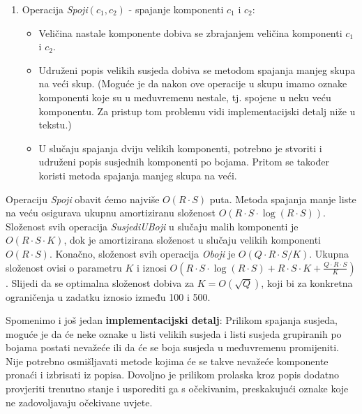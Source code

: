 \begin{enumerate}
  \item Operacija \textit{Spoji}$(c_1, c_2)$ - spajanje komponenti $c_1$ i $c_2$:
    \begin{itemize}[topsep=0pt]
      \item Veličina nastale komponente dobiva se zbrajanjem veličina komponenti
        $c_1$ i $c_2$.
      \item Udruženi popis velikih susjeda dobiva se metodom spajanja manjeg
        skupa na veći skup. (Moguće je da nakon ove operacije u skupu imamo
        oznake komponenti koje su u međuvremenu nestale, tj. spojene u neku
        veću komponentu. Za pristup tom problemu vidi implementacijski detalj
        niže u tekstu.)
      \item U slučaju spajanja dviju velikih komponenti, potrebno je stvoriti
        i udruženi popis susjednih komponenti po bojama. Pritom se također
        koristi metoda spajanja manjeg skupa na veći.
    \end{itemize}
\end{enumerate}

Operaciju \textit{Spoji} obavit ćemo najviše $O(R \cdot S)$ puta. Metoda
spajanja manje liste na veću osigurava ukupnu amortiziranu složenost $O(R \cdot
S \cdot \log (R \cdot S))$.  Složenost svih operacija \textit{SusjediUBoji} u
slučaju malih komponenti je $O(R \cdot S \cdot K)$, dok je amortizirana
složenost u slučaju velikih komponenti $O(R \cdot S)$. Konačno, složenost svih
operacija \textit{Oboji} je $O(Q \cdot R \cdot S / K)$. Ukupna složenost ovisi
o parametru $K$ i iznosi $O(R \cdot S \cdot \log(R \cdot S) + R \cdot S \cdot K
+ \frac{Q \cdot R \cdot S}{K})$.  Slijedi da se optimalna složenost dobiva za
$K = O(\sqrt{Q})$, koji bi za konkretna ograničenja u zadatku iznosio između
100 i 500.

Spomenimo i još jedan \textbf{implementacijski detalj}: Prilikom spajanja
susjeda, moguće je da će neke oznake u listi velikih susjeda i listi susjeda
grupiranih po bojama postati nevažeće ili da će se boja susjeda u međuvremenu
promijeniti.  Nije potrebno osmišljavati metode kojima će se takve nevažeće
komponente pronaći i izbrisati iz popisa. Dovoljno je prilikom prolaska kroz
popis dodatno provjeriti trenutno stanje i usporediti ga s očekivanim,
preskakujući oznake koje ne zadovoljavaju očekivane uvjete.
